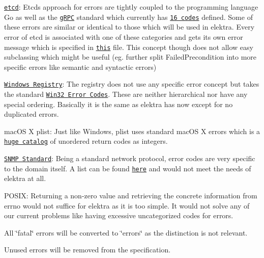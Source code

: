 \begin{DoxyItemize}
\item \href{https://github.com/etcd-io/etcd}{\tt etcd}\+: Etcd\textquotesingle{}s approach for errors are tightly coupled to the programming language Go as well as the \href{https://grpc.io/}{\tt g\+R\+PC} standard which currently has \href{https://godoc.org/google.golang.org/grpc/codes}{\tt 16 codes} defined. Some of these errors are similar or identical to those which will be used in elektra. Every error of etcd is associated with one of these categories and gets its own error message which is specified in \href{https://github.com/etcd-io/etcd/blob/master/etcdserver/api/v3rpc/rpctypes/error.go}{\tt this} file. This concept though does not allow easy subclassing which might be useful (eg. further split Failed\+Precondition into more specific errors like semantic and syntactic errors)
\item \href{https://docs.microsoft.com/en-us/windows/desktop/sysinfo/registry}{\tt Windows Registry}\+: The registry does not use any specific error concept but takes the standard \href{https://docs.microsoft.com/en-us/openspecs/windows_protocols/ms-erref/18d8fbe8-a967-4f1c-ae50-99ca8e491d2d}{\tt Win32 Error Codes}. These are neither hierarchical nor have any special ordering. Basically it is the same as elektra has now except for no duplicated errors.
\item mac\+OS X plist\+: Just like Windows, plist uses standard mac\+OS X errors which is a \href{http://krypted.com/lists/comprehensive-list-of-mac-os-x-error-codes/}{\tt huge catalog} of unordered return codes as integers.
\item \href{http://www.snmp.com/protocol/}{\tt S\+N\+MP Standard}\+: Being a standard network protocol, error codes are very specific to the domain itself. A list can be found \href{https://docs.microsoft.com/en-us/windows/desktop/snmp/snmp-error-codes}{\tt here} and would not meet the needs of elektra at all.
\item P\+O\+S\+IX\+: Returning a non-\/zero value and retrieving the concrete information from {\ttfamily errno} would not suffice for elektra as it is too simple. It would not solve any of our current problems like having excessive uncategorized codes for errors.
\end{DoxyItemize}

All \char`\"{}fatal\char`\"{} errors will be converted to \char`\"{}errors\char`\"{} as the distinction is not relevant.

Unused errors will be removed from the specification.

